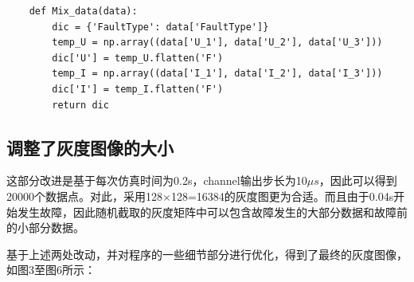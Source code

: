 \documentclass{article}
\begin{document}
	\begin{lstlisting}
	def Mix_data(data):
		dic = {'FaultType': data['FaultType']}
		temp_U = np.array((data['U_1'], data['U_2'], data['U_3']))
		dic['U'] = temp_U.flatten('F')
		temp_I = np.array((data['I_1'], data['I_2'], data['I_3']))
		dic['I'] = temp_I.flatten('F')
		return dic
	\end{lstlisting}

	\subsection{调整了灰度图像的大小}
	
	这部分改进是基于每次仿真时间为0.2s，channel输出步长为10$\mu s$，因此可以得到20000个数据点。对此，采用128$\times$128=16384的灰度图更为合适。而且由于0.04s开始发生故障，因此随机截取的灰度矩阵中可以包含故障发生的大部分数据和故障前的小部分数据。
	
	基于上述两处改动，并对程序的一些细节部分进行优化，得到了最终的灰度图像，如图3至图6所示：
	
\end{document}
